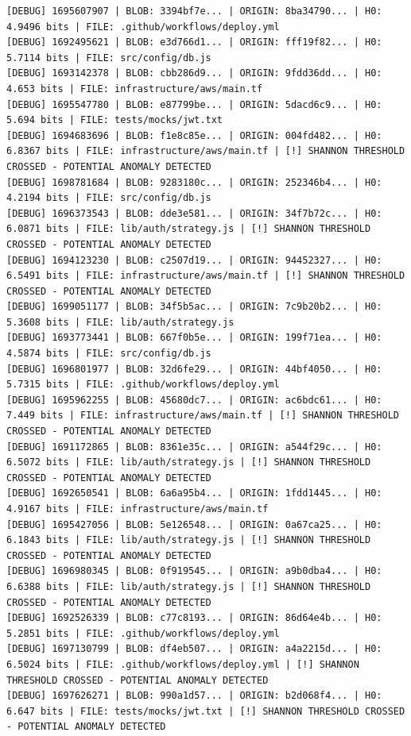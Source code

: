 \documentclass[12pt, a4paper, oneside]{report}
\begin{document}
\newpage
\begin{lstlisting}[basicstyle=\tiny\ttfamily]
[DEBUG] 1695607907 | BLOB: 3394bf7e... | ORIGIN: 8ba34790... | H0: 4.9496 bits | FILE: .github/workflows/deploy.yml
[DEBUG] 1692495621 | BLOB: e3d766d1... | ORIGIN: fff19f82... | H0: 5.7114 bits | FILE: src/config/db.js
[DEBUG] 1693142378 | BLOB: cbb286d9... | ORIGIN: 9fdd36dd... | H0: 4.653 bits | FILE: infrastructure/aws/main.tf
[DEBUG] 1695547780 | BLOB: e87799be... | ORIGIN: 5dacd6c9... | H0: 5.694 bits | FILE: tests/mocks/jwt.txt
[DEBUG] 1694683696 | BLOB: f1e8c85e... | ORIGIN: 004fd482... | H0: 6.8367 bits | FILE: infrastructure/aws/main.tf | [!] SHANNON THRESHOLD CROSSED - POTENTIAL ANOMALY DETECTED
[DEBUG] 1698781684 | BLOB: 9283180c... | ORIGIN: 252346b4... | H0: 4.2194 bits | FILE: src/config/db.js
[DEBUG] 1696373543 | BLOB: dde3e581... | ORIGIN: 34f7b72c... | H0: 6.0871 bits | FILE: lib/auth/strategy.js | [!] SHANNON THRESHOLD CROSSED - POTENTIAL ANOMALY DETECTED
[DEBUG] 1694123230 | BLOB: c2507d19... | ORIGIN: 94452327... | H0: 6.5491 bits | FILE: infrastructure/aws/main.tf | [!] SHANNON THRESHOLD CROSSED - POTENTIAL ANOMALY DETECTED
[DEBUG] 1699051177 | BLOB: 34f5b5ac... | ORIGIN: 7c9b20b2... | H0: 5.3608 bits | FILE: lib/auth/strategy.js
[DEBUG] 1693773441 | BLOB: 667f0b5e... | ORIGIN: 199f71ea... | H0: 4.5874 bits | FILE: src/config/db.js
[DEBUG] 1696801977 | BLOB: 32d6fe29... | ORIGIN: 44bf4050... | H0: 5.7315 bits | FILE: .github/workflows/deploy.yml
[DEBUG] 1695962255 | BLOB: 45680dc7... | ORIGIN: ac6bdc61... | H0: 7.449 bits | FILE: infrastructure/aws/main.tf | [!] SHANNON THRESHOLD CROSSED - POTENTIAL ANOMALY DETECTED
[DEBUG] 1691172865 | BLOB: 8361e35c... | ORIGIN: a544f29c... | H0: 6.5072 bits | FILE: lib/auth/strategy.js | [!] SHANNON THRESHOLD CROSSED - POTENTIAL ANOMALY DETECTED
[DEBUG] 1692650541 | BLOB: 6a6a95b4... | ORIGIN: 1fdd1445... | H0: 4.9167 bits | FILE: infrastructure/aws/main.tf
[DEBUG] 1695427056 | BLOB: 5e126548... | ORIGIN: 0a67ca25... | H0: 6.1843 bits | FILE: lib/auth/strategy.js | [!] SHANNON THRESHOLD CROSSED - POTENTIAL ANOMALY DETECTED
[DEBUG] 1696980345 | BLOB: 0f919545... | ORIGIN: a9b0dba4... | H0: 6.6388 bits | FILE: lib/auth/strategy.js | [!] SHANNON THRESHOLD CROSSED - POTENTIAL ANOMALY DETECTED
[DEBUG] 1692526339 | BLOB: c77c8193... | ORIGIN: 86d64e4b... | H0: 5.2851 bits | FILE: .github/workflows/deploy.yml
[DEBUG] 1697130799 | BLOB: df4eb507... | ORIGIN: a4a2215d... | H0: 6.5024 bits | FILE: .github/workflows/deploy.yml | [!] SHANNON THRESHOLD CROSSED - POTENTIAL ANOMALY DETECTED
[DEBUG] 1697626271 | BLOB: 990a1d57... | ORIGIN: b2d068f4... | H0: 6.647 bits | FILE: tests/mocks/jwt.txt | [!] SHANNON THRESHOLD CROSSED - POTENTIAL ANOMALY DETECTED

\end{lstlisting}
\end{document}
